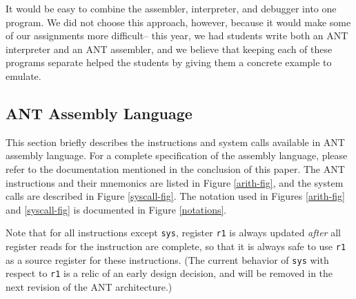 It would be easy to combine the assembler, interpreter, and debugger
into one program.  We did not choose this approach, however, because
it would make some of our assignments more difficult-- this year, we
had students write both an ANT interpreter and an ANT assembler, and
we believe that keeping each of these programs separate helped the
students by giving them a concrete example to emulate.

\subsection{ANT Assembly Language}

This section briefly describes the instructions and system calls
available in ANT assembly language.  For a complete specification
of the assembly language, please refer to the documentation mentioned
in the conclusion of this paper.
The ANT instructions and their mnemonics are listed in
Figure \ref{arith-fig}, and the system calls are described in
Figure \ref{syscall-fig}.
The notation used in Figures \ref{arith-fig} and \ref{syscall-fig}
is documented in Figure \ref{notations}.

Note that for all instructions except {\tt sys}, register {\tt r1} is
always updated {\em after} all register reads for the instruction are
complete, so that it is always safe to use {\tt r1} as a source
register for these instructions.  (The current behavior of {\tt sys}
with respect to {\tt r1} is a relic of an early design decision, and
will be removed in the next revision of the ANT architecture.)

